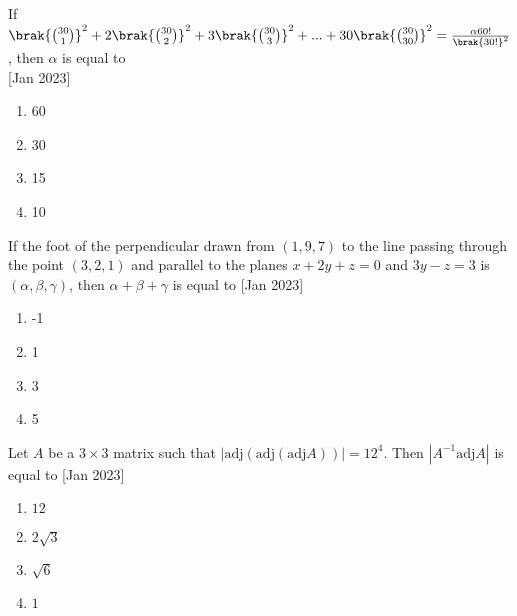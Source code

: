  	\item{
			If $\brak{\binom{30}{1}}^2 + 2\brak{\binom{30}{2}}^2+ 3\brak{\binom{30}{3}}^2 + ... + 30\brak{\binom{30}{30}}^2 = \frac{\alpha 60!}{\brak{30!}^2}$, then $\alpha$ is equal to \\
			\text{ }
			\hfill
			{[Jan 2023]}
			
			\begin{multicols}{4}
				\begin{enumerate}
					\item 60
					\item 30
					\item 15
					\item 10
				\end{enumerate}
			\end{multicols}
			
		}
 	\item{
			If the foot of the perpendicular drawn from $(1, 9, 7)$
			to the line passing through the point $(3, 2, 1)$ and
			parallel to the planes $x + 2y + z = 0$ and $3y - z = 3$
			is $(\alpha, \beta, \gamma)$, then $\alpha + \beta + \gamma$ is equal to\hfill
			{[Jan 2023]}
			
			\begin{multicols}{4}
				\begin{enumerate}
					\item -1
					\item 1
					\item 3
					\item 5
				\end{enumerate}
			\end{multicols}
			
		}
    \item{
          	Let $A$ be a $3 \times 3$ matrix such that $|\text{adj} (\text{adj} (\text{adj} A))| = 12^4$. Then $|A^{-1} \text{adj} A|$ is equal to
             \text{ }
             \hfill
                {[Jan 2023]}
            \begin{multicols}{4}
                \begin{enumerate}
                	\item $12$
                	\item $2\sqrt{3}$
                	\item $\sqrt{6}$
                	\item $1$
                \end{enumerate}
            \end{multicols}

        
        }
